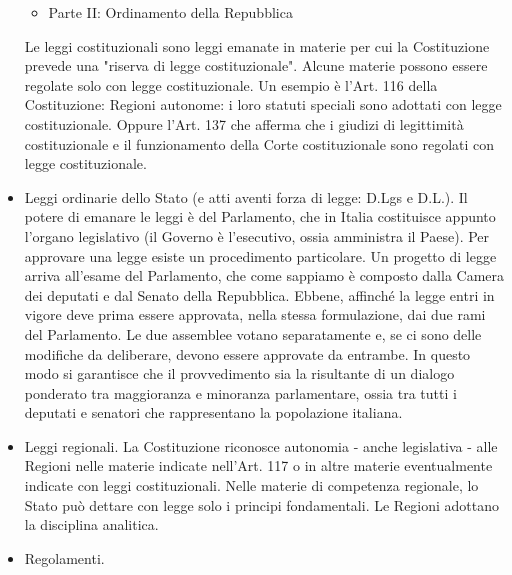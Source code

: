\begin{itemize}
\begin{itemize}
\begin{itemize}
                \end{itemize}
            \item Parte II: Ordinamento della Repubblica
        \end{itemize}
        Le leggi costituzionali sono leggi emanate in materie per cui
        la Costituzione prevede una "riserva di legge costituzionale". Alcune materie possono essere regolate
        solo con legge costituzionale. \newline
        Un esempio è l'Art. 116 della Costituzione: Regioni autonome: i loro
        statuti speciali sono adottati con legge costituzionale. Oppure l'Art. 137 che afferma
        che i giudizi di legittimità costituzionale e il funzionamento della Corte costituzionale
        sono regolati con legge costituzionale.
    \item Leggi ordinarie dello Stato (e atti aventi forza di legge: D.Lgs e D.L.). \newline
        Il potere di emanare le leggi è del Parlamento, che in Italia costituisce appunto l'organo 
        legislativo (il Governo è l'esecutivo, ossia amministra il Paese).\newline
        Per approvare una legge esiste un procedimento particolare. Un progetto di legge arriva 
        all'esame del Parlamento, che come sappiamo è composto dalla Camera dei deputati e dal Senato 
        della Repubblica. Ebbene, affinché la legge entri in vigore deve prima essere approvata, nella 
        stessa formulazione, dai due rami del Parlamento. Le due assemblee votano separatamente e, se 
        ci sono delle modifiche da deliberare, devono essere approvate da entrambe. In questo modo si 
        garantisce che il provvedimento sia la risultante di un dialogo ponderato tra maggioranza e 
        minoranza parlamentare, ossia tra tutti i deputati e senatori che rappresentano la popolazione italiana.
    \item Leggi regionali. \newline
        La Costituzione riconosce autonomia - anche legislativa - alle Regioni nelle materie indicate
        nell'Art. 117 o in altre materie eventualmente indicate con leggi costituzionali.\newline
        Nelle materie di competenza regionale, lo Stato può dettare con legge solo i principi
        fondamentali.\newline
        Le Regioni adottano la disciplina analitica.
    \item Regolamenti.\newline

\end{itemize}

